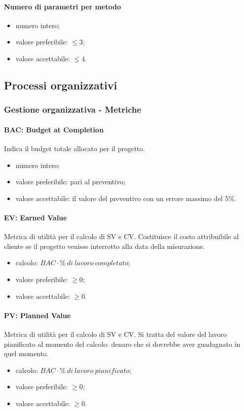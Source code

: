 		\paragraph{Numero di parametri per metodo}
		\begin{itemize}
		\item numero intero;
		\item valore preferibile: $\leq 3$;
		\item valore accettabile: $ \leq 4$.
		\end{itemize}
		
	\subsection{Processi organizzativi}
		\subsubsection{Gestione organizzativa - Metriche}
		\paragraph{BAC: Budget at Completion}
		Indica il budget totale allocato per il progetto.
		\begin{itemize}
		\item numero intero;
		\item valore preferibile: pari al preventivo;
		\item valore accettabile: il valore del preventivo con un errore massimo del $5\%$.
		\end{itemize}
		
		\paragraph{EV: Earned Value}
		Metrica di utilità per il calcolo di SV e CV. Costituisce il costo attribuibile al cliente se il progetto venisse interrotto alla data della misurazione.
		\begin{itemize}
		\item calcolo: $BAC \cdot \% \  di \ lavoro \ completato$;
		\item valore preferibile: $\geq 0$;
		\item valore accettabile: $\geq 0$.
		\end{itemize}
		
		\paragraph{PV: Planned Value}
		Metrica di utilità per il calcolo di SV e CV. Si tratta del valore del lavoro pianificato al momento del calcolo: denaro che si dovrebbe aver guadagnato in quel momento.
		\begin{itemize}
		\item calcolo: $BAC \cdot \% \ di \ lavoro \ pianificato$;
		\item valore preferibile: $\geq 0$;
		\item valore accettabile: $\geq 0$.
		\end{itemize}
		
